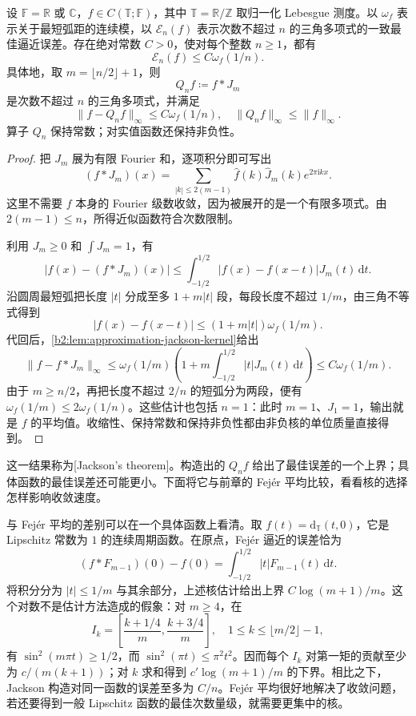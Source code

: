 \begin{theorem}
\label{b2:thm:approximation-jackson-periodic}
设 \(\mathbb F=\mathbb R\) 或 \(\mathbb C\)，\(f\in C(\mathbb T;\mathbb F)\)，其中 \(\mathbb T=\mathbb R/\mathbb Z\) 取归一化 Lebesgue 测度。以 \(\omega_f\) 表示关于最短弧距的连续模，以 \(\mathcal E_n(f)\) 表示次数不超过 \(n\) 的三角多项式的一致最佳逼近误差。存在绝对常数 \(C>0\)，使对每个整数 \(n\geq1\)，都有
\[
 \mathcal E_n(f)\leq C\omega_f(1/n).
\]
具体地，取 \(m=\lfloor n/2\rfloor+1\)，则
\[
 Q_nf\coloneqq f*J_m
\]
是次数不超过 \(n\) 的三角多项式，并满足
\[
 \lVert f-Q_nf\rVert_\infty\leq C\omega_f(1/n),
 \quad \lVert Q_nf\rVert_\infty\leq\lVert f\rVert_\infty.
\]
算子 \(Q_n\) 保持常数；对实值函数还保持非负性。
\end{theorem}
\begin{proof}
把 \(J_m\) 展为有限 Fourier 和，逐项积分即可写出
\[
 (f*J_m)(x)=\sum_{|k|\leq2(m-1)}
     \widehat f(k)\widehat J_m(k)e^{2\pi\mathrm i kx}.
\]
这里不需要 \(f\) 本身的 Fourier 级数收敛，因为被展开的是一个有限多项式。由 \(2(m-1)\leq n\)，所得近似函数符合次数限制。

利用 \(J_m\geq0\) 和 \(\int J_m=1\)，有
\[
 |f(x)-(f*J_m)(x)|
 \leq\int_{-1/2}^{1/2}|f(x)-f(x-t)|J_m(t)\,\mathrm dt.
\]
沿圆周最短弧把长度 \(|t|\) 分成至多 \(1+m|t|\) 段，每段长度不超过 \(1/m\)，由三角不等式得到
\[
 |f(x)-f(x-t)|\leq(1+m|t|)\omega_f(1/m).
\]
代回后，\cref{b2:lem:approximation-jackson-kernel}给出
\[
 \lVert f-f*J_m\rVert_\infty
 \leq\omega_f(1/m)\left(1+m\int_{-1/2}^{1/2}|t|J_m(t)\,\mathrm dt\right)
 \leq C\omega_f(1/m).
\]
由于 \(m\geq n/2\)，再把长度不超过 \(2/n\) 的短弧分为两段，便有 \(\omega_f(1/m)\leq2\omega_f(1/n)\)。这些估计也包括 \(n=1\)：此时 \(m=1\)、\(J_1=1\)，输出就是 \(f\) 的平均值。收缩性、保持常数和保持非负性都由非负核的单位质量直接得到。
\end{proof}

这一结果称为[Jackson's theorem]。构造出的 \(Q_nf\) 给出了最佳误差的一个上界；具体函数的最佳误差还可能更小。下面将它与前章的 Fejér 平均比较，看看核的选择怎样影响收敛速度。

\ProseParagraphBreak

与 Fejér 平均的差别可以在一个具体函数上看清。取 \(f(t)=\mathrm d_{\mathbb T}(t,0)\)，它是 Lipschitz 常数为 \(1\) 的连续周期函数。在原点，Fejér 逼近的误差恰为
\[
 (f*F_{m-1})(0)-f(0)
 =\int_{-1/2}^{1/2}|t|F_{m-1}(t)\,\mathrm dt.
\]
将积分分为 \(|t|\leq1/m\) 与其余部分，上述核估计给出上界 \(C\log(m+1)/m\)。这个对数不是估计方法造成的假象：对 \(m\geq4\)，在
\[
 I_k=\left[\frac{k+1/4}{m},\frac{k+3/4}{m}\right],
 \quad 1\leq k\leq\lfloor m/2\rfloor-1,
\]
有 \(\sin^2(m\pi t)\geq1/2\)，而 \(\sin^2(\pi t)\leq\pi^2t^2\)。因而每个 \(I_k\) 对第一矩的贡献至少为 \(c/(m(k+1))\)；对 \(k\) 求和得到 \(c'\log(m+1)/m\) 的下界。相比之下，Jackson 构造对同一函数的误差至多为 \(C/n\)。Fejér 平均很好地解决了收敛问题，若还要得到一般 Lipschitz 函数的最佳次数量级，就需要更集中的核。

